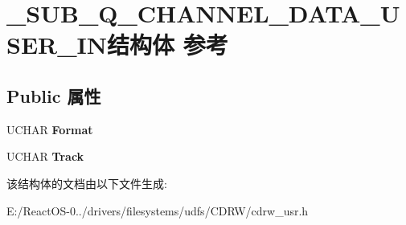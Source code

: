 \hypertarget{struct___s_u_b___q___c_h_a_n_n_e_l___d_a_t_a___u_s_e_r___i_n}{}\section{\+\_\+\+S\+U\+B\+\_\+\+Q\+\_\+\+C\+H\+A\+N\+N\+E\+L\+\_\+\+D\+A\+T\+A\+\_\+\+U\+S\+E\+R\+\_\+\+I\+N结构体 参考}
\label{struct___s_u_b___q___c_h_a_n_n_e_l___d_a_t_a___u_s_e_r___i_n}
\subsection*{Public 属性}
\begin{DoxyCompactItemize}
\item 
\mbox{\label{struct___s_u_b___q___c_h_a_n_n_e_l___d_a_t_a___u_s_e_r___i_n_acb255efdd5c7ffcba168372e2e728618}} 
U\+C\+H\+AR {\bfseries Format}
\item 
\mbox{\label{struct___s_u_b___q___c_h_a_n_n_e_l___d_a_t_a___u_s_e_r___i_n_a00c1003393aca4ace45a500fa958cd33}} 
U\+C\+H\+AR {\bfseries Track}
\end{DoxyCompactItemize}


该结构体的文档由以下文件生成\+:\begin{DoxyCompactItemize}
\item 
E\+:/\+React\+O\+S-\/0../drivers/filesystems/udfs/\+C\+D\+R\+W/cdrw\+\_\+usr.\+h\end{DoxyCompactItemize}
